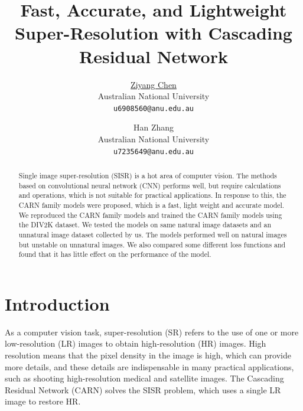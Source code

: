 \documentclass[final]{cvpr}
\begin{document}
\title{Fast, Accurate, and Lightweight Super-Resolution with Cascading Residual Network}
\author{
\underline{Ziyang Chen}\\
Australian National University\\
{\tt\small u6908560@anu.edu.au}
\and
Han Zhang\\
Australian National University\\
{\tt\small u7235649@anu.edu.au}
}

\maketitle

\begin{abstract}

Single image super-resolution (SISR) is a hot area of computer vision. The methods based on convolutional neural network (CNN) performs well, but require calculations and operations, which is not suitable for practical applications. In response to this, the CARN family models were proposed, which is a fast, light weight and accurate model. We reproduced the CARN family models and trained the CARN family models using the DIV2K dataset. We tested the models on same natural image datasets and an unnatural image dataset collected by us. The models performed well on natural images but unstable on unnatural images. We also compared some different loss functions and found that it has little effect on the performance of the model. 

\end{abstract}

\section{Introduction}

As a computer vision task, super-resolution (SR) refers to the use of one or more low-resolution (LR) images to obtain high-resolution (HR) images. High resolution means that the pixel density in the image is high, which can provide more details, and these details are indispensable in many practical applications, such as shooting high-resolution medical and satellite images. The Cascading Residual Network (CARN) \cite{r1} solves the SISR problem, which uses a single LR image to restore HR. 
\end{document}
